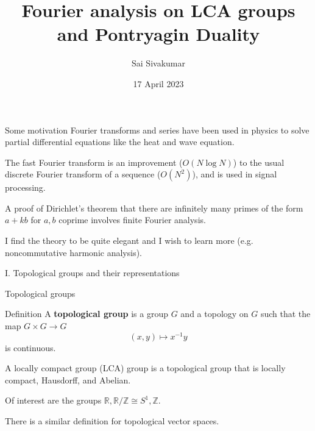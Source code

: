 \documentclass[mathserif
, handout
]{beamer}
\title
{\textcolor{black!85}{Fourier analysis on LCA groups and Pontryagin Duality}}
\author[Sai Sivakumar]{Sai Sivakumar}
\date{17 April 2023}
\begin{document}
\frame{\titlepage}

\begin{frame}{Some motivation}
    Fourier transforms and series have been used in physics to solve partial differential equations like the heat and wave equation. %
    \pause

    The fast Fourier transform is an improvement ($O(N\log N)$) to the usual discrete Fourier transform of a sequence ($O(N^2)$), and is used in signal processing. %
    \pause

    A proof of Dirichlet's theorem that there are infinitely many primes of the form $a+kb$ for $a,b$ coprime involves finite Fourier analysis.
    \pause

    I find the theory to be quite elegant and I wish to learn more (e.g. noncommutative harmonic analysis).
\end{frame}

\begin{frame}{}
    \begin{block}{}{
        \begin{center}\Large I. Topological groups and their representations\end{center}}
    \end{block}
\end{frame}

\begin{frame}{Topological groups}
    \begin{block}{Definition}
        A \textbf{topological group} is a group $G$ and a topology on $G$ such that the map $G\times G\to G$ \[(x,y)\mapsto x^{-1}y\] is continuous.
    \end{block} 
    \pause

    A locally compact group (LCA) group is a topological group that is locally compact, Hausdorff, and Abelian.
    \pause

    Of interest are the groups $\mathbb{R}, \mathbb{R}/\mathbb{Z}\cong S^1, \mathbb{Z}$.
    \pause

    There is a similar definition for topological vector spaces.
\end{frame}
\end{document}
